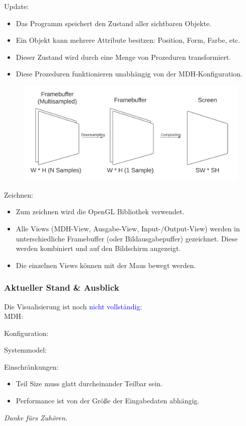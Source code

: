 \documentclass{presentation}
\begin{document}
\begin{frame}[allowframebreaks]
	\framebreak
	
	Update:
	\bigskip
	\begin{itemize}
		\item Das Programm speichert den Zustand aller sichtbaren Objekte.
		\item Ein Objekt kann mehrere Attribute besitzen: Position, Form, Farbe, etc.
		\item Dieser Zustand wird durch eine Menge von Prozeduren transformiert.
		\item Diese Prozeduren funktionieren unabhängig von der MDH-Konfiguration.
	\end{itemize}
	
	\framebreak
	
	\begin{figure}
		\includegraphics[scale=0.3]{render_pipeline.jpg}
	\end{figure}
	
	Zeichnen:
	\bigskip
	\begin{itemize}
		\item Zum zeichnen wird die OpenGL Bibliothek verwendet.
		\item Alle Views (MDH-View, Ausgabe-View, Input-/Output-View) werden in unterschiedliche Framebuffer (oder Bildausgabepuffer) gezeichnet. Diese werden kombiniert und auf den Bildschirm angezeigt.
		\item Die einzelnen Views können mit der Maus bewegt werden.
	\end{itemize}
\end{frame}

\begin{frame}
	\frametitle{Aktueller Stand \& Ausblick}
	Die Visualisierung ist noch \textcolor{blue}{nicht vollständig}:\\
	MDH:
	
	\framebreak
	Konfiguration:
	
	\framebreak
	Systemmodel:
	
	\framebreak
	
	Einschränkungen:
	\begin{itemize}
		\item Teil Size muss glatt durcheinander Teilbar sein.
		\item Performance ist von der Größe der Eingabedaten abhängig.
	\end{itemize}
\end{frame}

\begin{frame}
	\centering \Huge
	\emph{Danke fürs Zuhören.}
\end{frame}
\end{document}
